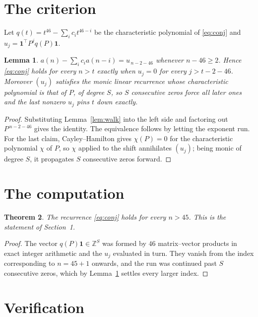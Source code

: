 \documentclass[11pt,a4paper]{article}
\theoremstyle{plain}
\newtheorem{theorem}{Theorem}
\newtheorem{lemma}[theorem]{Lemma}
\theoremstyle{definition}
\begin{document}
\section{The criterion}

Let $q(t)=t^{46}-\sum_i c_i t^{46-i}$ be the characteristic polynomial of
\eqref{eq:conj} and $u_j=\mathbf{1}^{\!\top}P^{j}q(P)\mathbf{1}$.

\begin{lemma}\label{lem:crit}
$a(n)-\sum_i c_i a(n-i)=u_{\,n-2-46}$ whenever $n-46\ge2$. Hence
\eqref{eq:conj} holds for every $n>t$ exactly when $u_j=0$ for every
$j>t-2-46$. Moreover $(u_j)$ satisfies the monic linear recurrence whose
characteristic polynomial is that of $P$, of degree $S$, so $S$ consecutive zeros force all
later ones and the last nonzero $u_j$ pins $t$ down exactly.
\end{lemma}

\begin{proof}
Substituting Lemma~\ref{lem:walk} into the left side and factoring out
$P^{\,n-2-46}$ gives the identity. The equivalence follows by letting the exponent
run. For the last claim, Cayley--Hamilton gives $\chi(P)=0$ for the characteristic
polynomial $\chi$ of $P$, so $\chi$ applied to the shift annihilates $(u_j)$; being monic of
degree $S$, it propagates $S$ consecutive zeros forward.
\end{proof}

\section{The computation}

\begin{theorem}
The recurrence \eqref{eq:conj} holds for every $n>45$. This is the statement of
Section~1.
\end{theorem}

\begin{proof}
The vector $q(P)\mathbf{1}\in\mathbb{Z}^{S}$ was formed by $46$ matrix--vector
products in exact integer arithmetic and the $u_j$ evaluated in turn. They vanish from the
index corresponding to $n=45+1$ onwards, and the run was continued past $S$ consecutive
zeros, which by Lemma~\ref{lem:crit} settles every larger index.
\end{proof}

\section{Verification}
\end{document}
